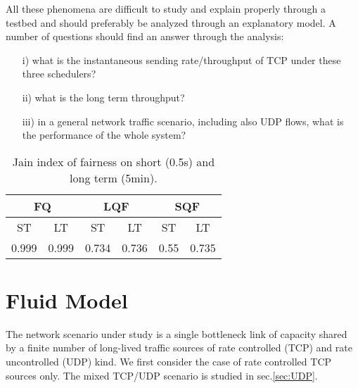 \documentclass[a4paper,oneside, 11pt]{article}
\begin{document}
All these phenomena are difficult to study and explain properly through a testbed and should
preferably be analyzed through an explanatory model.
A number of questions should find an answer through the analysis:
\begin{itemize}
\item[i)] what is the instantaneous sending rate/throughput of TCP under these three schedulers?
\item[ii)] what is the long term throughput?
\item[iii)] in a general network traffic scenario, including also UDP flows, what
is the performance of the whole system?
\end{itemize}
\begin{table}
\centering
\begin{tabular}{|cc|cc|cc|}
\hline
 \multicolumn{2}{|c}{{FQ}} & \multicolumn{2}{|c}{{LQF}} &\multicolumn{2}{|c|}{{SQF}} \\
\hline
\hline
ST & LT  & ST  & LT & ST & LT \\
0.999 & 0.999 & 0.734  & 0.736 & 0.55 & 0.735 \\
\hline
\end{tabular}
\caption{Jain index of fairness on short (0.5s) and long term (5min).}
\label{tab:fairness}
\end{table}

\section{Fluid Model}\label{sec:model}
The network scenario under study is a single bottleneck link of capacity  shared by a finite number  of
long-lived traffic sources of rate controlled (TCP) and rate uncontrolled (UDP) kind.
We first consider the case of rate controlled TCP sources only. The mixed TCP/UDP scenario is studied
in sec.\ref{sec:UDP}.
\end{document}
